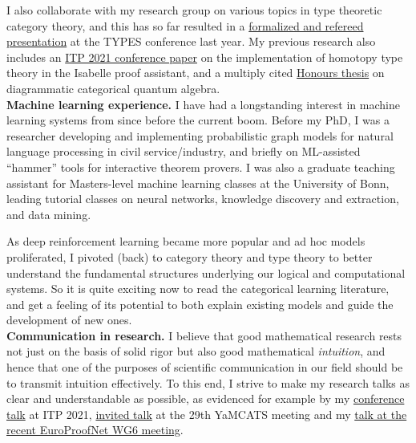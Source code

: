 \documentclass[12pt,a4paper]{article}
\newcommand{\hpar}[1]{\noindent\textbf{#1.}}
\begin{document}
I also collaborate with my research group on various topics in type theoretic category theory, and this has so far resulted in a \href{https://types2023.webs.upv.es/slides/S10/TYPES2023-Chen-deJong-Kraus-Pradal.pdf}{formalized and refereed presentation} at the TYPES conference last year.
My previous research also includes an \href{https://drops.dagstuhl.de/entities/document/10.4230/LIPIcs.ITP.2021.12}{ITP 2021 conference paper} on the implementation of homotopy type theory in the Isabelle proof assistant, and a multiply cited \href{https://scholar.google.com/citations?view_op=view_citation&hl=en&user=OOY9aVYAAAAJ&citation_for_view=OOY9aVYAAAAJ:2osOgNQ5qMEC}{Honours thesis} on diagrammatic categorical quantum algebra. \\[3ex]
%
\hpar{Machine learning experience}
I have had a longstanding interest in machine learning systems from since before the current boom.
Before my PhD, I was a researcher
developing and implementing probabilistic graph models for natural language processing in civil service/industry, and briefly
on ML-assisted ``hammer'' tools for interactive theorem provers.
I was also a graduate teaching assistant for Masters-level machine learning classes at the University of Bonn, leading tutorial classes on neural networks, knowledge discovery and extraction, and data mining.

As deep reinforcement learning became more popular and ad hoc models proliferated, I pivoted (back) to category theory and type theory to better understand the fundamental structures underlying our logical and computational systems.
So it is quite exciting now to read the categorical learning literature, and get a feeling of its potential to both explain existing models and guide the development of new ones. \\[3ex]
%
\hpar{Communication in research}
I believe that good mathematical research rests not just on the basis of solid rigor but also good mathematical \emph{intuition}, and hence that one of the purposes of scientific communication in our field should be to transmit intuition effectively.
To this end, I strive to make my research talks as clear and understandable as possible, as evidenced for example by my \href{https://www.youtube.com/watch?v=fGnIdt_jPfA&t=4630s}{conference talk} at ITP 2021, \href{https://conferences.leeds.ac.uk/yamcats/meeting-29/}{invited talk} at the 29th YaMCATS meeting and my \href{https://www.youtube.com/watch?v=cB9hml8YBj4}{talk at the recent EuroProofNet WG6 meeting}.
\end{document}
